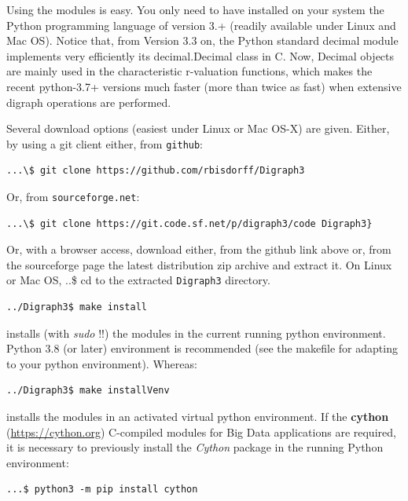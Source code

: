 Using the \Digraph modules is easy. You only need to have installed on your system the Python programming language of version 3.+ (readily available under Linux and Mac OS). Notice that, from Version 3.3 on, the Python standard decimal module implements very efficiently its decimal.Decimal class in C. Now, Decimal objects are mainly used in the \Digraph characteristic r-valuation functions, which makes the recent python-3.7+ versions much faster (more than twice as fast) when extensive digraph operations are performed.

Several download options (easiest under Linux or Mac OS-X) are given. Either, by using a git client either, from \texttt{github}:
\begin{footnotesize}
\begin{verbatim}
...\$ git clone https://github.com/rbisdorff/Digraph3
\end{verbatim}
\end{footnotesize}
Or, from \texttt{sourceforge.net}:
\begin{footnotesize}
\begin{verbatim}
...\$ git clone https://git.code.sf.net/p/digraph3/code Digraph3}
\end{verbatim}
\end{footnotesize}
Or, with a browser access, download either, from the github link above or, from the sourceforge page the latest distribution zip archive and extract it. On Linux or Mac OS, ..\$ cd to the extracted \texttt{Digraph3} directory.
\begin{footnotesize}
\begin{verbatim}
../Digraph3$ make install
\end{verbatim}
\end{footnotesize}
installs (with \emph{sudo} !!) the \Digraph modules in the current running python environment. Python 3.8 (or later) environment is recommended (see the makefile for adapting to your python environment). Whereas:
\begin{footnotesize}
\begin{verbatim}
../Digraph3$ make installVenv
\end{verbatim}          
\end{footnotesize}
installs the \Digraph modules in an activated virtual python environment. If the \textbf{cython} (\href{https://cython.org}{https://cython.org}) C-compiled modules for Big Data applications are required, it is necessary to previously install the \emph{Cython} package in the running Python environment:
\begin{footnotesize}
\begin{verbatim}
...$ python3 -m pip install cython
\end{verbatim}
\end{footnotesize}
